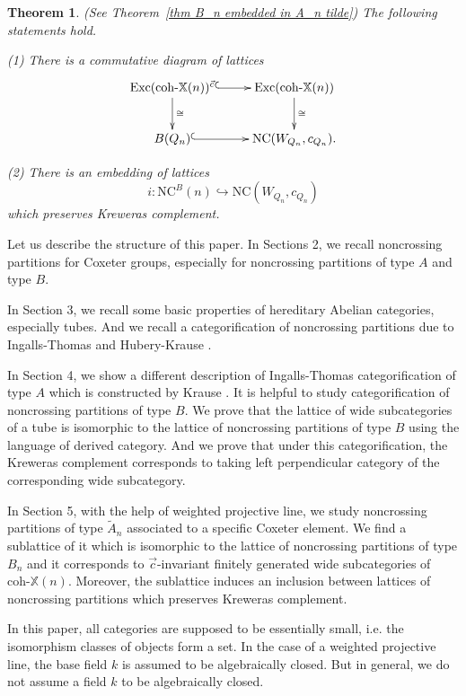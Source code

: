 \documentclass[a4paper, 11pt, reqno]{amsart}
\numberwithin{equation}{section}
\newtheorem{thm}{Theorem}[section]
\theoremstyle{remark}
\theoremstyle{definition}
\begin{document}
\begin{thm} (See Theorem~\ref{thm B_n embedded in A_n tilde})
   The following statements hold.

   (1) There is a commutative diagram of lattices
   \[
   \xymatrix{\mathrm{Exc}(\mathrm{coh} \text{-} \mathbb X(n))^{\vec c} \ar@{^(->}[r] \ar[d]^{\cong} & \mathrm{Exc}(\mathrm{coh} \text{-} \mathbb X(n)) \ar[d]^{\cong} \\
   B(Q_n) \ar@{^(->}[r] & \mathrm{NC}(W_{Q_n},c_{Q_n}).
   }
   \]

   (2) There is an embedding of lattices 
   \[
     i: \mathrm{NC}^B(n) \hookrightarrow \mathrm{NC}(W_{Q_n},c_{Q_n})
   \] 
   which preserves Kreweras complement.
\end{thm}

Let us describe the structure of this paper. In Sections 2, we recall noncrossing partitions for Coxeter groups, especially for noncrossing partitions of type $A$ and type $B$. 

In Section 3, we recall some basic properties of hereditary Abelian categories, especially tubes. And we recall a categorification of noncrossing partitions due to Ingalls-Thomas \cite{ingalls2009noncrossing} and Hubery-Krause \cite{hubery2016categorification}.

In Section 4, we show a different description of Ingalls-Thomas  categorification of type $A$ which is constructed by Krause \cite{krause2021category}. It is helpful to study categorification of noncrossing partitions of type $B$. We prove that the lattice of wide subcategories of a tube is isomorphic to the lattice of noncrossing partitions of type $B$ using the language of derived category. And we prove that under this categorification, the Kreweras complement corresponds to taking left perpendicular category of the corresponding wide subcategory.

In Section 5, with the help of weighted projective line, we study noncrossing partitions of type $\tilde A_n$ associated to a specific Coxeter element. We find a sublattice of it which is isomorphic to the lattice of noncrossing partitions of type $B_n$ and it corresponds to $\vec c$-invariant finitely generated wide subcategories of $\mathrm{coh} \text{-} \mathbb X(n)$. Moreover, the sublattice induces an inclusion between lattices of noncrossing partitions which preserves Kreweras complement.

In this paper, all categories are supposed to be essentially small, i.e. the isomorphism classes of objects form a set. In the case of a weighted projective line, the base field $k$ is assumed to be algebraically closed. But in general, we do not assume a field $k$ to be algebraically closed.
\end{document}

